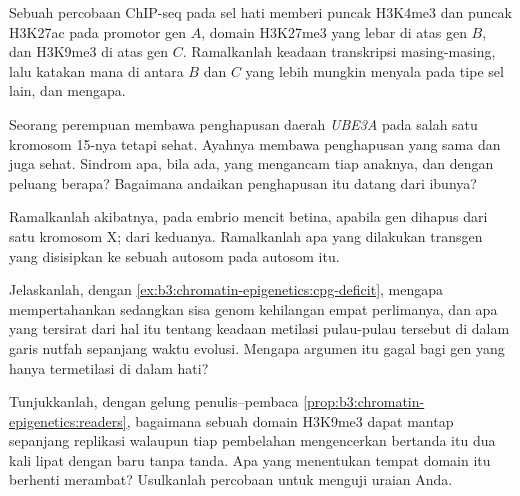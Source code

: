 \begin{exercise}[$\star\star$]\label{exo:b3:chromatin-epigenetics:7}
Sebuah percobaan ChIP-seq pada sel hati memberi puncak H3K4me3 dan puncak
H3K27ac pada promotor gen $A$, domain H3K27me3 yang lebar di atas gen $B$,
dan H3K9me3 di atas gen $C$. Ramalkanlah keadaan transkripsi masing-masing,
lalu katakan mana di antara $B$ dan $C$ yang lebih mungkin menyala pada tipe
sel lain, dan mengapa.
\end{exercise}

\begin{exercise}[$\star\star$]\label{exo:b3:chromatin-epigenetics:8}
Seorang perempuan membawa penghapusan daerah \emph{UBE3A} pada salah satu
kromosom 15-nya tetapi sehat. Ayahnya membawa penghapusan yang sama dan juga
sehat. Sindrom apa, bila ada, yang mengancam tiap anaknya, dan dengan peluang
berapa? Bagaimana andaikan penghapusan itu datang dari ibunya?
\end{exercise}

\begin{exercise}[$\star\star$]\label{exo:b3:chromatin-epigenetics:9}
Ramalkanlah akibatnya, pada embrio mencit betina, apabila gen
\emph{} dihapus dari satu kromosom X; dari keduanya. Ramalkanlah apa yang
dilakukan transgen \emph{} yang disisipkan ke sebuah autosom pada autosom itu.
\end{exercise}

\begin{exercise}[$\star\star\star$]\label{exo:b3:chromatin-epigenetics:10}
Jelaskanlah, dengan \cref{ex:b3:chromatin-epigenetics:cpg-deficit}, mengapa
 mempertahankan  sedangkan sisa genom kehilangan empat
perlimanya, dan apa yang tersirat dari hal itu tentang keadaan metilasi
pulau-pulau tersebut di dalam garis nutfah sepanjang waktu evolusi. Mengapa
argumen itu gagal bagi gen yang hanya termetilasi di dalam hati?
\end{exercise}

\begin{exercise}[$\star\star\star$]\label{exo:b3:chromatin-epigenetics:11}
Tunjukkanlah, dengan gelung penulis--pembaca
\cref{prop:b3:chromatin-epigenetics:readers}, bagaimana sebuah domain H3K9me3
dapat mantap sepanjang replikasi walaupun tiap pembelahan mengencerkan 
bertanda itu dua kali lipat dengan  baru tanpa tanda. Apa yang
menentukan tempat domain itu berhenti merambat? Usulkanlah percobaan untuk menguji uraian Anda.
\end{exercise}

